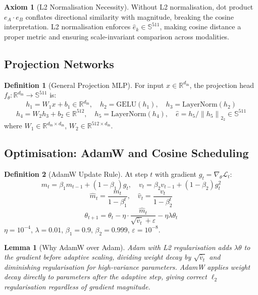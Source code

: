 \documentclass[12pt,a4paper]{article}
\theoremstyle{definition}
\newtheorem{definition}{Definition}[section]
\newtheorem{axiom}{Axiom}[section]
\theoremstyle{plain}
\newtheorem{lemma}[theorem]{Lemma}
\theoremstyle{remark}
\newcommand{\R}{\mathbb{R}}
\newcommand{\Sph}{\mathbb{S}}
\newcommand{\Norm}[1]{\left\|#1\right\|_2}
\newcommand{\LN}{\mathrm{LayerNorm}}
\newcommand{\GELU}{\mathrm{GELU}}
\begin{document}
\begin{axiom}[L2 Normalisation Necessity]
Without L2 normalisation, dot product $e_A \cdot e_B$ conflates directional similarity with magnitude, breaking the cosine interpretation. L2 normalisation enforces $\hat{e}_k \in \Sph^{511}$, making cosine distance a proper metric and ensuring scale-invariant comparison across modalities.
\end{axiom}

\subsection{Projection Networks}

\begin{definition}[General Projection MLP]
\label{def:projmlp}
For input $x \in \R^{d_{\text{in}}}$, the projection head $f_\theta : \R^{d_{\text{in}}} \to \Sph^{511}$ is:
\[
  h_1 = W_1 x + b_1 \in \R^{d_{\text{in}}}, \quad h_2 = \GELU(h_1), \quad h_3 = \LN(h_2)
\]
\[
  h_4 = W_2 h_3 + b_2 \in \R^{512}, \quad h_5 = \LN(h_4), \quad \hat{e} = h_5 / \Norm{h_5}_2 \in \Sph^{511}
\]
where $W_1 \in \R^{d_{\text{in}} \times d_{\text{in}}}$, $W_2 \in \R^{512 \times d_{\text{in}}}$.
\end{definition}

\subsection{Optimisation: AdamW and Cosine Scheduling}

\begin{definition}[AdamW Update Rule]
At step $t$ with gradient $g_t = \nabla_\theta \mathcal{L}_t$:
\[
  m_t = \beta_1 m_{t-1} + (1-\beta_1)g_t, \quad v_t = \beta_2 v_{t-1} + (1-\beta_2)g_t^2
\]
\[
  \hat{m}_t = \frac{m_t}{1-\beta_1^t}, \quad \hat{v}_t = \frac{v_t}{1-\beta_2^t}
\]
\[
  \boxed{\theta_{t+1} = \theta_t - \eta \cdot \frac{\hat{m}_t}{\sqrt{\hat{v}_t}+\varepsilon} - \eta\lambda\theta_t}
\]
$\eta = 10^{-4}$, $\lambda = 0.01$, $\beta_1 = 0.9$, $\beta_2 = 0.999$, $\varepsilon = 10^{-8}$.
\end{definition}

\begin{lemma}[Why AdamW over Adam]
Adam with L2 regularisation adds $\lambda\theta$ to the gradient before adaptive scaling, dividing weight decay by $\sqrt{\hat{v}_t}$ and diminishing regularisation for high-variance parameters. AdamW applies weight decay directly to parameters after the adaptive step, giving correct $\ell_2$ regularisation regardless of gradient magnitude.
\end{lemma}
\end{document}
